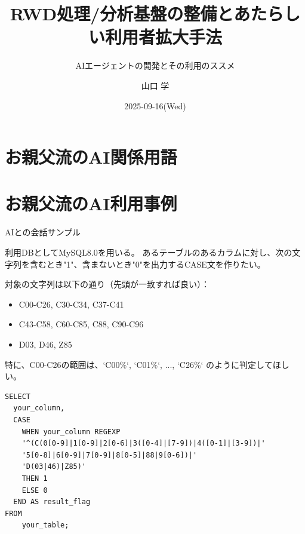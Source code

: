 \documentclass[uplatex,dvipdfmx,9pt,a4paper,cjk]{beamer}
\begin{document}
\begin{frame}%
  \title{RWD処理/分析基盤の整備とあたらしい利用者拡大手法}
  \subtitle{AIエージェントの開発とその利用のススメ}
  \author{山口 学}
  \institute{}
  \date[]{2025-09-16(Wed)}
  \maketitle
\end{frame}

\section{お親父流のAI関係用語}

\section{お親父流のAI利用事例}

\begin{frame}{AIとの会話サンプル}

  \begin{mychat}
    利用DBとしてMySQL8.0を用いる。
    あるテーブルのあるカラムに対し、次の文字列を含むとき"1"、含まないとき"0"を出力するCASE文を作りたい。

    対象の文字列は以下の通り（先頭が一致すれば良い）：
    \begin{itemize}
        \item C00-C26, C30-C34, C37-C41
        \item C43-C58, C60-C85, C88, C90-C96
        \item D03, D46, Z85
    \end{itemize}
    特に、C00-C26の範囲は、`C00\%`, `C01\%`, ..., `C26\%` のように判定してほしい。
  \end{mychat}

  \begin{aichat}
    \begin{scriptsize}
    \begin{verbatim}
SELECT
  your_column,
  CASE
    WHEN your_column REGEXP 
    '^(C(0[0-9]|1[0-9]|2[0-6]|3([0-4]|[7-9])|4([0-1]|[3-9])|'
    '5[0-8]|6[0-9]|7[0-9]|8[0-5]|88|9[0-6])|'
    'D(03|46)|Z85)'
    THEN 1
    ELSE 0
  END AS result_flag
FROM
    your_table;
    \end{verbatim}
  \end{scriptsize}
  \end{aichat}

\end{frame}
\end{document}
